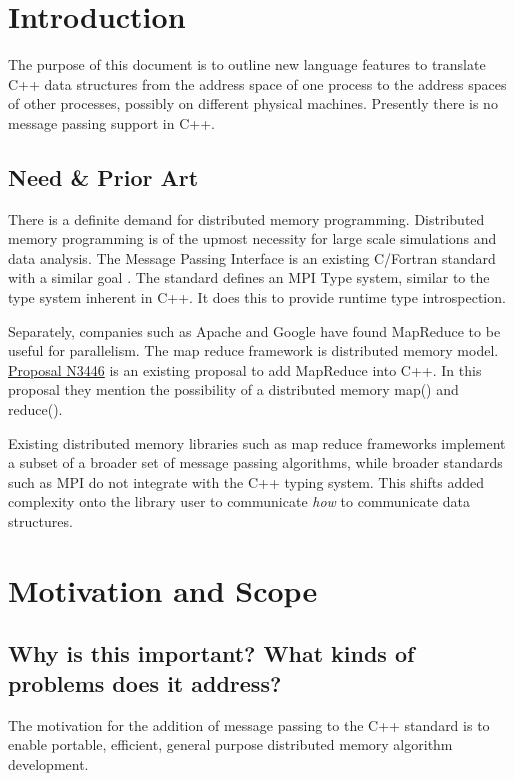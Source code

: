 \documentclass{isocpp_proposal}
\date{\today}
\begin{document}
\maketitle

\section{Introduction}
The purpose of this document is to outline new language features to translate 
C++ data structures from the address space of one process to the address spaces of other processes, possibly on different physical machines. 
Presently there is no message passing support in C++. 

\subsection{Need \& Prior Art}
There is a definite demand for distributed memory programming. Distributed memory programming is of the upmost necessity for 
large scale simulations and data analysis. The Message Passing Interface is an existing C/Fortran standard with a similar goal \cite{mpistandard}.
The standard defines an MPI Type system, similar to the type system inherent in C++. It does this to provide runtime type introspection. 

Separately, companies such as Apache and Google have found MapReduce to be useful for parallelism. The map reduce framework is  distributed memory model. 
\href{http://www.open-std.org/jtc1/sc22/wg21/docs/papers/2012/n3446.pdf}{Proposal N3446} is an existing proposal to add MapReduce into C++. In this proposal
they mention the possibility of a distributed memory map() and reduce().

Existing distributed memory libraries such as map reduce frameworks implement a subset of a broader set of message passing algorithms, while broader standards
such as MPI do not integrate with the C++ typing system. This shifts added complexity onto the library user to communicate \emph{how} to communicate data structures.

\section{Motivation and Scope}

\subsection{Why is this important? What kinds of problems does it address?}
The motivation for the addition of message passing to the C++ standard is to enable 
portable, efficient, general purpose distributed memory algorithm development. 
\end{document}
